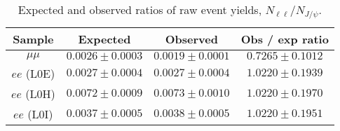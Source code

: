 \begin{table}[h]
\centering
 \caption{Expected and observed ratios of raw event yields, $N_{\ell\ell} / N_{J/\psi}$. }
\begin{tabular}{|c|c|c|c|}
\hline
 Sample 			& Expected 			& Observed 			& Obs / exp ratio \\ \hline
$\mu\mu$ 	& $ 0.0026  \pm  0.0003 $ 	& $ 0.0019  \pm  0.0001 $ 	& $ 0.7265  \pm  0.1012 $ \\
\hline
$ee$ (L0E) 	& $ 0.0027  \pm  0.0004 $ 	& $ 0.0027  \pm  0.0004 $ 	& $ 1.0220  \pm  0.1939 $ \\

$ee$ (L0H) 	& $ 0.0072  \pm  0.0009 $ 	& $ 0.0073  \pm  0.0010 $ 	& $ 1.0220  \pm  0.1970 $ \\

$ee$ (L0I) 	& $ 0.0037  \pm  0.0005 $ 	& $ 0.0038  \pm  0.0005 $ 	& $ 1.0220  \pm  0.1951 $ \\

\hline 
 \end{tabular}
 \label{tab:RKst_expectations}
\end{table}

\clearpage

